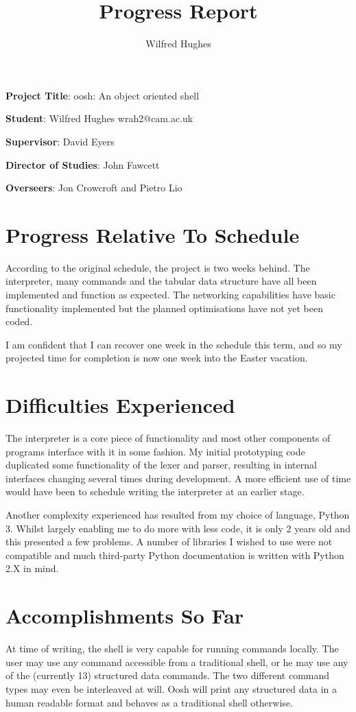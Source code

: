 \documentclass[a4paper]{article}
\begin{document}
\title{Progress Report}
\author{Wilfred Hughes}
\maketitle

{\bf Project Title}: oosh: An object oriented shell

\medskip

{\bf Student}: Wilfred Hughes wrah2@cam.ac.uk

{\bf Supervisor}: David Eyers

{\bf Director of Studies}: John Fawcett

{\bf Overseers}: Jon Crowcroft and Pietro Lio

\section{Progress Relative To Schedule}
According to the original schedule, the project is two weeks behind. The
interpreter, many commands and the tabular data structure have all been
implemented and function as expected. The networking capabilities have basic
functionality implemented but the planned optimisations have not yet been
coded.

I am confident that I can recover one week in the schedule this term, and so my
projected time for completion is now one week into the Easter vacation.

\section{Difficulties Experienced}
The interpreter is a core piece of functionality and most other components of
programs interface with it in some fashion. My initial prototyping code
duplicated some functionality of the lexer and parser, resulting in internal
interfaces changing several times during development. A more efficient use of
time would have been to schedule writing the interpreter at an earlier stage.

Another complexity experienced has resulted from my choice of language, Python
3. Whilst largely enabling me to do more with less code, it is only 2 years old
and this presented a few problems. A number of libraries I wished to use were
not compatible and much third-party Python documentation is written with Python
2.X in mind. 

\section{Accomplishments So Far}
At time of writing, the shell is very capable for running commands locally. The
user may use any command accessible from a traditional shell, or he may use any
of the (currently 13) structured data commands. The two different command types
may even be interleaved at will. Oosh will print any structured data in a human
readable format and behaves as a traditional shell otherwise.
\end{document}
